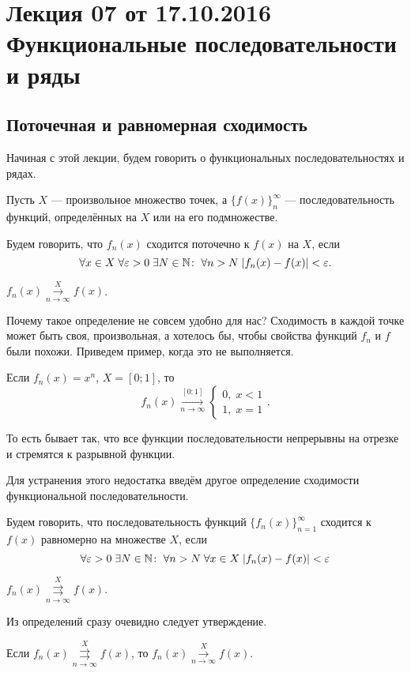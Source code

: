 \documentclass[a4paper, 12pt]{article}
\begin{document}
\pagestyle{fancy}
\section{Лекция 07 от 17.10.2016 \\ Функциональные последовательности и ряды}
	\subsection{Поточечная и равномерная сходимость}
	Начиная с этой лекции, будем говорить о функциональных последовательностях и рядах.
	\par Пусть $X$ --- произвольное множество точек, а $\{f(x)\}_n^\infty$ --- последовательность функций, определённых на $X$ или на его подмножестве.
	\begin{Def}
		Будем говорить, что $f_n(x)$ сходится поточечно к $f(x)$ на $X$, если
		$$
		\forall x \in X\; \forall \varepsilon>0\; \exists N\in \mathbb{N}\colon \; \forall n>N\; |f_n(x) - f(x)| < \varepsilon.
		$$
	\end{Def}
	\begin{Designation}
	$f_n(x) \overset{X}{\underset{n\to\infty}{\longrightarrow}} f(x)$.
	\end{Designation}
	Почему такое определение не совсем удобно для нас? Сходимость в каждой точке может быть своя, произвольная, а хотелось бы, чтобы свойства функций $f_n$ и $f$ были похожи. Приведем пример, когда это не выполняется.
	\begin{Examples}
		Если $f_n(x) = x^n$, $X = [0;1]$, то
		$$
		f_n(x) \overset{[0;1]}{\underset{n\to\infty}{\longrightarrow}}		
		\begin{cases*}
			0,\;x<1\\
			1,\;x = 1
		\end{cases*}.
		$$
	\end{Examples}
	То есть бывает так, что все функции последовательности непрерывны на отрезке и стремятся к разрывной функции.
	\par Для устранения этого недостатка введём другое определение сходимости функциональной последовательности.
	\begin{Def}
		Будем говорить, что последовательность функций $\{f_n(x)\}_{n=1}^\infty$ сходится к $f(x)$ равномерно на множестве $X$, если 
		$$
		\forall \varepsilon > 0\; \exists N\in \mathbb{N}\colon \; \forall n>N\; \forall x \in X\; |f_n(x) - f(x)| < \varepsilon
		$$
	\end{Def}
	\begin{Designation}
		$f_n(x) \overset{X}{\underset{n\to\infty}{\rightrightarrows}} f(x)$.
	\end{Designation}
	Из определений сразу очевидно следует утверждение.
	\begin{Statement}
		Если $f_n(x)\overset{X}{\underset{n\to\infty}{\rightrightarrows}} f(x)$, то $f_n(x) \overset{X}{\underset{n\to\infty}{\longrightarrow}} f(x)$.
	\end{Statement}
	
\end{document}
